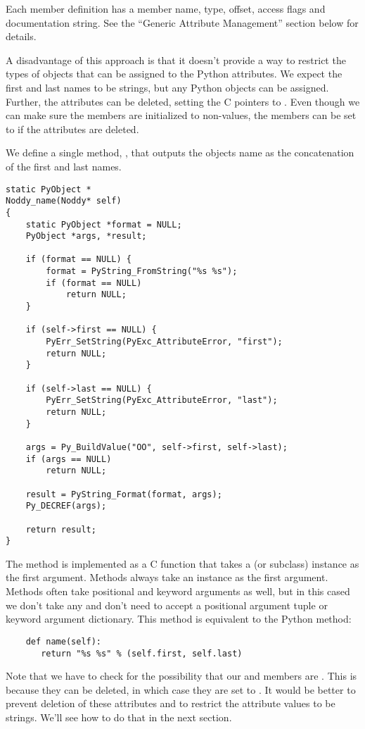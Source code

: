 Each member definition has a member name, type, offset, access flags
and documentation string. See the ``Generic Attribute Management''
section below for details.

A disadvantage of this approach is that it doesn't provide a way to
restrict the types of objects that can be assigned to the Python
attributes.  We expect the first and last names to be strings, but any
Python objects can be assigned.  Further, the attributes can be
deleted, setting the C pointers to \NULL.  Even though we can make
sure the members are initialized to non-\NULL values, the members can
be set to \NULL if the attributes are deleted.

We define a single method, , that outputs the objects
name as the concatenation of the first and last names.  

\begin{verbatim}
static PyObject *
Noddy_name(Noddy* self)
{
    static PyObject *format = NULL;
    PyObject *args, *result;

    if (format == NULL) {
        format = PyString_FromString("%s %s");
        if (format == NULL)
            return NULL;
    }

    if (self->first == NULL) {
        PyErr_SetString(PyExc_AttributeError, "first");
        return NULL;
    }

    if (self->last == NULL) {
        PyErr_SetString(PyExc_AttributeError, "last");
        return NULL;
    }

    args = Py_BuildValue("OO", self->first, self->last);
    if (args == NULL)
        return NULL;

    result = PyString_Format(format, args);
    Py_DECREF(args);
    
    return result;
}
\end{verbatim}

The method is implemented as a C function that takes a  (or
 subclass) instance as the first argument.  Methods
always take an instance as the first argument. Methods often take
positional and keyword arguments as well, but in this cased we don't
take any and don't need to accept a positional argument tuple or
keyword argument dictionary. This method is equivalent to the Python
method:

\begin{verbatim}
    def name(self):
       return "%s %s" % (self.first, self.last)
\end{verbatim}

Note that we have to check for the possibility that our 
and  members are \NULL.  This is because they can be
deleted, in which case they are set to \NULL.  It would be better to
prevent deletion of these attributes and to restrict the attribute
values to be strings.  We'll see how to do that in the next section.

